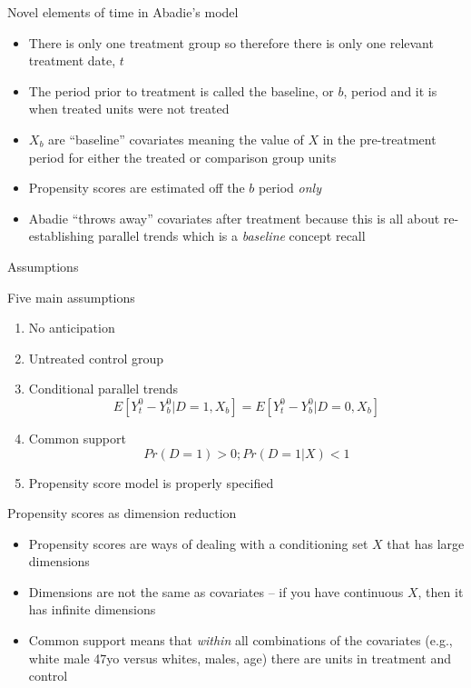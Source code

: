 \documentclass{beamer}
\begin{document}
\begin{frame}{Novel elements of time in Abadie's model}

\begin{itemize}
\item There is only one treatment group so therefore there is only one relevant treatment date, $t$
\item The period prior to treatment is called the baseline, or $b$, period and it is when treated units were not treated 
\item $X_b$ are ``baseline'' covariates meaning the value of $X$ in the pre-treatment period for either the treated or comparison group units
\item Propensity scores are estimated off the $b$ period \emph{only} 
\item Abadie ``throws away'' covariates after treatment because this is all about re-establishing parallel trends which is a \emph{baseline} concept recall
\end{itemize}

\end{frame}

\begin{frame}{Assumptions}

Five main assumptions

\begin{enumerate}
\item No anticipation 
\item Untreated control group
\item Conditional parallel trends $$E[Y^0_t - Y^0_b|D=1,X_b] = E[Y^0_t - Y^0_b | D=0, X_b]$$ 
\item Common support $$Pr(D=1)>0; Pr(D=1|X)<1$$ 
\item Propensity score model is properly specified 
\end{enumerate}

\end{frame}

\begin{frame}{Propensity scores as dimension reduction}

\begin{itemize}

\item Propensity scores are ways of dealing with a conditioning set $X$ that has large dimensions
\item Dimensions are not the same as covariates -- if you have continuous $X$, then it has infinite dimensions
\item Common support means that \emph{within} all combinations of the covariates (e.g., white male 47yo versus whites, males, age) there are units in treatment and control

\end{itemize}

\end{frame}
\end{document}
